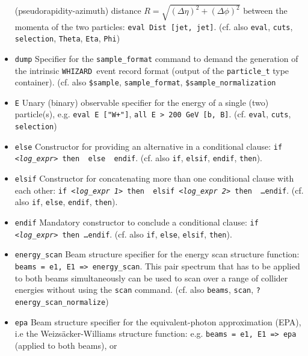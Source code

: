 \documentclass[12pt]{book}
\newcommand{\ttt}[1]{\texttt{#1}}
\newcommand{\whizard}{\ttt{WHIZARD}}
\begin{document}
\begin{itemize}
(pseudorapidity-azimuth) distance $R = \sqrt{(\Delta \eta)^2 +
(\Delta\phi)^2}$ between the momenta of the two particles: \ttt{eval
Dist [jet, jet]}. (cf. also \ttt{eval}, \ttt{cuts}, \ttt{selection},
\ttt{Theta}, \ttt{Eta}, \ttt{Phi})
\item
\ttt{dump} \newline
Specifier for the \ttt{sample\_format} command to demand the
generation of the intrinsic \whizard\ event record format
(output of the \ttt{particle\_t} type container). (cf. also
\ttt{\$sample}, \ttt{sample\_format}, \ttt{\$sample\_normalization}
\item
\ttt{E} \newline
Unary (binary) observable specifier for the energy of a single
(two) particle(s), e.g. \ttt{eval E ["W+"]}, \ttt{all E > 200 GeV [b,
  B]}. (cf. \ttt{eval}, \ttt{cuts}, \ttt{selection})
\item
\ttt{else} \label{sindarin_else}\newline
Constructor for providing an alternative in a conditional clause:
\ttt{if {\em <log\_expr>} then {\em <expr 1>} else {\em <expr 2>} endif}. (cf. also
\ttt{if}, \ttt{elsif}, \ttt{endif}, \ttt{then}).
\item
\ttt{elsif} \newline
Constructor for concatenating more than one conditional clause with
each other: \ttt{if {\em <log\_expr 1>} then {\em <expr 1>} elsif {\em <log\_expr 2>}
then {\em <expr 2>} \ldots endif}. (cf. also \ttt{if}, \ttt{else},
\ttt{endif}, \ttt{then}).
\item
\ttt{endif} \newline
Mandatory constructor to conclude a conditional clause: \ttt{if
  {\em <log\_expr>} then \ldots endif}. (cf. also \ttt{if},
\ttt{else}, \ttt{elsif}, \ttt{then}).
\item
\ttt{energy\_scan} \newline
Beam structure specifier for the energy scan structure function:
\ttt{beams = e1, E1 => energy\_scan}. This pair spectrum that has to
be applied to both beams simultaneously can be used to scan over a
range of collider energies without using the \ttt{scan} command.
(cf. also \ttt{beams}, \ttt{scan}, \ttt{?energy\_scan\_normalize})
\item
\ttt{epa} \newline
Beam structure specifier for the equivalent-photon approximation
(EPA), i.e the Weizs\"acker-Williams structure function:
e.g. \ttt{beams = e1, E1 => epa} (applied to both beams), or

\end{itemize}
\end{document}
